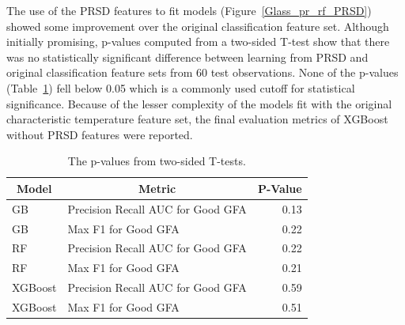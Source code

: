 \documentclass[11pt,a4paper]{article}                                %
\begin{document}
\par
The use of the PRSD features to fit models (Figure~\ref{Glass_pr_rf_PRSD}) showed some improvement over the original classification feature set. Although initially promising, p-values computed from a two-sided T-test show that there was no statistically significant difference between learning from PRSD and original classification feature sets from 60 test observations. None of the p-values (Table~\ref{pvals}) fell below 0.05 which is a commonly used cutoff for statistical significance. Because of the lesser complexity of the models fit with the original characteristic temperature feature set, the final evaluation metrics of XGBoost without PRSD features were reported.

\begin{table}[H]
\centering
\caption{The p-values from two-sided T-tests.}
\begin{tabular}{|llr|}
\hline
\multicolumn{1}{|c}{Model} & \multicolumn{1}{c}{Metric}       & \multicolumn{1}{c|}{P-Value} \\ \hline
\hline
GB         & Precision Recall AUC for Good GFA & 0.13    \\ \hline
GB         & Max F1 for Good GFA               & 0.22    \\ \hline
RF         & Precision Recall AUC for Good GFA & 0.22    \\ \hline
RF         & Max F1 for Good GFA               & 0.21    \\ \hline
XGBoost    & Precision Recall AUC for Good GFA & 0.59    \\ \hline
XGBoost    & Max F1 for Good GFA               & 0.51    \\ \hline
\end{tabular}
\label{pvals}
\end{table}
\end{document}
